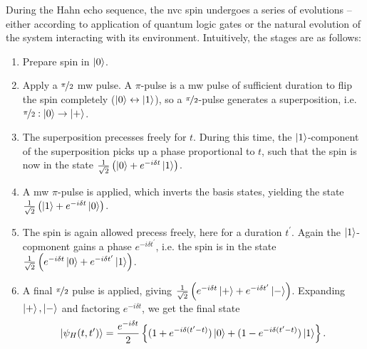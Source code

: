 \par 
During the Hahn echo sequence, the \gls{nvc} spin undergoes a series of evolutions -- 
    either according to application of quantum logic gates
    or the natural evolution of the system interacting with its environment.
Intuitively, the stages are as follows: 
\begin{enumerate}[label=(\alph*)]

    \item Prepare spin in $\ket{0}$.
    \item Apply a $\nicefrac{\pi}{2}$ \gls{mw} pulse. 
    A $\pi$-pulse is a \gls{mw} pulse of sufficient duration to flip the spin completely ($\ket{0} \leftrightarrow \ket{1}$), 
    so a $\nicefrac{\pi}{2}$-pulse generates a superposition, i.e. $\nicefrac{\pi}{2}: \ket{0} \rightarrow \ket{+}$.
    \item The superposition precesses freely for $t$. During this time, the $\ket{1}$-component of the superposition picks
        up a phase proportional to $t$, such that the spin is now in the state $\frac{1}{\sqrt{2}}\left( \ket{0} + e^{-i \delta t}\ket{1}\right)$. 
    \item A \gls{mw} $\pi$-pulse is applied, which inverts the basis states, yielding the state $\frac{1}{\sqrt{2}}\left( \ket{1} + e^{-i \delta t}\ket{0}\right)$.
    \item The spin is again allowed precess freely, here for a duration $t^{\prime}$. 
        Again the $\ket{1}$-copmonent gains a phase $e^{-i \delta t^{\prime}}$, 
        i.e. the spin is in the state $\frac{1}{\sqrt{2}}\left( e^{-i \delta t}\ket{0} + e^{-i \delta t^{\prime}}\ket{1} \right)$.
    \item A final $\nicefrac{\pi}{2}$ pulse is applied, giving 
        $\frac{1}{\sqrt{2}}\left( e^{-i \delta t}\ket{+} + e^{-i \delta t^{\prime}}\ket{-} \right)$.
        Expanding $\ket{+}, \ket{-}$ and factoring $e^{-i \delta t}$, we get the final state
        \begin{equation}
            \ket{\psi_H(t, t^{\prime})} = \frac{e^{-i \delta t}}{2} \left\{ (1 + e^{-i \delta(t^{\prime} - t)})\ket{0} + (1 - e^{-i \delta(t^{\prime} - t)})\ket{1}  \right\}.    
        \end{equation}
\end{enumerate}

